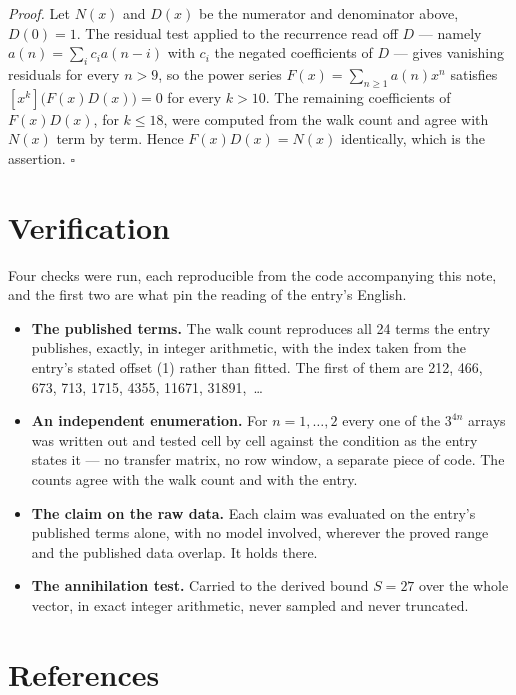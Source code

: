 \documentclass[11pt]{article}
\theoremstyle{definition}
\begin{document}
{\itshape Proof.} Let $N(x)$ and $D(x)$ be the numerator and denominator above, $D(0)=1$. The residual test applied to the recurrence read off $D$ --- namely $a(n) = \sum_i c_i a(n-i)$ with $c_i$ the negated coefficients of $D$ --- gives vanishing residuals for every $n > 9$, so the power series $F(x)=\sum_{n\ge 1}a(n)x^n$ satisfies $[x^k]\bigl(F(x)D(x)\bigr) = 0$ for every $k > 10$. The remaining coefficients of $F(x)D(x)$, for $k \le 18$, were computed from the walk count and agree with $N(x)$ term by term. Hence $F(x)D(x) = N(x)$ identically, which is the assertion. $\square$

\section{Verification}

Four checks were run, each reproducible from the code accompanying this note, and the first two are what pin the reading of the entry's English.

\begin{itemize}

\item {\bfseries The published terms.} The walk count reproduces all 24 terms the entry publishes, exactly, in integer arithmetic, with the index taken from the entry's stated offset (1) rather than fitted. The first of them are 212, 466, 673, 713, 1715, 4355, 11671, 31891,~\dots

\item {\bfseries An independent enumeration.} For $n = 1,\dots,2$ every one of the $3^{4n}$ arrays was written out and tested cell by cell against the condition as the entry states it --- no transfer matrix, no row window, a separate piece of code. The counts agree with the walk count and with the entry.

\item {\bfseries The claim on the raw data.} Each claim was evaluated on the entry's published terms alone, with no model involved, wherever the proved range and the published data overlap. It holds there.

\item {\bfseries The annihilation test.} Carried to the derived bound $S = 27$ over the whole vector, in exact integer arithmetic, never sampled and never truncated.

\end{itemize}

\section{References}
\end{document}
